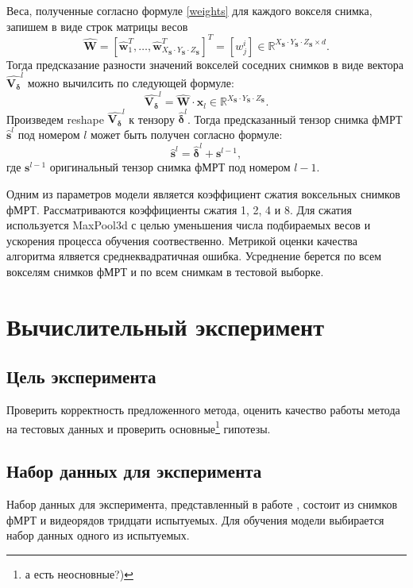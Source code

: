 \documentclass[12pt,twoside]{article}
\begin{document}
Веса, полученные согласно формуле \eqref{weights} для каждого вокселя снимка, запишем в виде строк матрицы весов
\begin{equation}
\label{matrix_weights}
    \hat{\bm{W}} = [\hat{\bm{w}}_1^T, \dots, \hat{\bm{w}}_{X_{\bm{S}} \cdot Y_{\bm{S}} \cdot Z_{\bm{S}}}^T]^T = [w^i_j] \in \mathbb{R}^{X_{\bm{S}} \cdot Y_{\bm{S}} \cdot Z_{\bm{S}} \times d}.
\end{equation}
Тогда предсказание разности значений вокселей соседних снимков в виде вектора $\hat{\bm{{V_{\delta}}}}^l$ можно вычилсить по следующей формуле:
\begin{equation}
\label{Vector_delta}
    \hat{\bm{{V_{\delta}}}}^l = \hat{\bm{W}} \cdot \bm{x}_l \in \mathbb{R}^{X_{\bm{S}} \cdot Y_{\bm{S}} \cdot Z_{\bm{S}}}.
\end{equation}
Произведем reshape $\hat{\bm{{V_{\delta}}}}^l$ к тензору $\hat{\bm{\delta}}^l$. Тогда предсказанный тензор снимка фМРТ $\hat{\bm{s}}^l$ под номером $l$ может быть получен согласно формуле:
\begin{equation}
    \label{Vector_delta}
    \hat{\bm{s}}^l = \hat{\bm{\delta}}^l + \bm{s}^{l-1},
\end{equation}
где $\bm{s}^{l-1}$ оригинальный тензор снимка фМРТ под номером $l-1$.


Одним из параметров модели является коэффициент сжатия воксельных снимков фМРТ. 
Рассматриваются коэффициенты сжатия 1, 2, 4 и 8.
Для сжатия используется MaxPool3d с целью уменьшения числа подбираемых весов и ускорения процесса обучения соотвественно.
Метрикой оценки качества алгоритма ялвяется среднеквадратичная ошибка.
Усреднение берется по всем вокселям снимков фМРТ и по всем снимкам в тестовой выборке.


\section{Вычислительный эксперимент}
\subsection{Цель эксперимента}
Проверить корректность предложенного метода, оценить качество работы метода на тестовых данных и проверить основные\footnote{ а есть неосновные?)}  гипотезы.
\subsection{Набор данных для эксперимента}
Набор данных для эксперимента, представленный в работе \citep{Berezutskaya2022}, состоит из снимков фМРТ и видеорядов тридцати испытуемых. 
Для обучения модели выбирается набор данных одного из испытуемых. 
\end{document}

